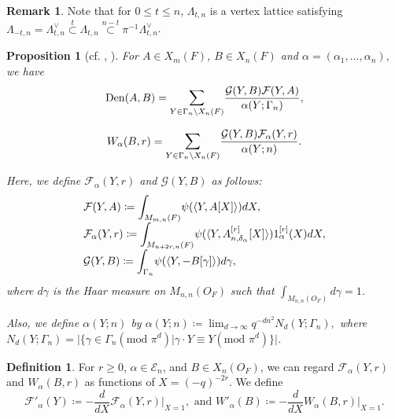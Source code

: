 \documentclass[11pt,oneside]{amsart}
\theoremstyle{plain}
\newtheorem{proposition}[theorem]{Proposition}
\theoremstyle{definition}
\newtheorem{definition}[theorem]{Definition}
\newtheorem{remark}[theorem]{Remark}
\theoremstyle{remark}
\newcommand{\CE}{{\mathcal E}}
\newcommand{\CF}{{\mathcal F}}
\newcommand{\CG}{{\mathcal G}}
\newcommand{\alphad}{\mathrm{Den}}
\numberwithin{equation}{section}
\begin{document}
	\begin{remark}
		Note that for $0 \leq t \leq n$, $\Lambda_{t,n}$ is a vertex lattice satisfying $\Lambda_{-t,n}=\Lambda_{t,n}^{\vee} \overset{t}{\subset} \Lambda_{t,n} \overset{n-t}{\subset} \pi^{-1}\Lambda_{t,n}^{\vee}$.
	\end{remark}
	
	
	\begin{proposition}[cf. {\cite{Hi}}, {\cite[Lemma 3.5]{Cho}}]\label{proposition2.3}  For $A \in X_{m}(F)$, $B \in X_{n}(F)$ and $\alpha=(\alpha_1,\dots, \alpha_n)$, we have
		\begin{equation*}
			\alphad(A,B)=\mathlarger{\sum}_{Y \in \Gamma_{n} \setminus X_{n}(F)}\dfrac{\CG(Y,B)\CF(Y,A)}{\alpha(Y;\Gamma_{n})},
		\end{equation*}
		
		\begin{equation*}
			W_{\alpha}(B,r)=\mathlarger{\sum}_{Y \in \Gamma_{n} \setminus X_{n}(F)}\dfrac{\CG(Y,B)\CF_{\alpha}(Y,r)}{\alpha(Y;n)}.
		\end{equation*}
		
		Here, we define $\CF_{\alpha}(Y,r)$ and $\CG(Y,B)$ as follows:
		\begin{equation*}\begin{array}{l}
				\CF(Y,A)\coloneqq \mathlarger{\int}_{M_{m,n}(F)}\psi(\langle Y,A[X] \rangle)dX,\\
				\CF_{\alpha}(Y,r)\coloneqq \mathlarger{\int}_{M_{n+2r,n}(F)}\psi(\langle Y,A_{n,\delta_{\alpha}}^{[r]}[X] \rangle)1_{\alpha}^{[r]}(X)dX,\\
				\CG(Y,B)\coloneqq \mathlarger{\int}_{\Gamma_{n}}\psi(\langle Y, -B[\gamma]\rangle)d\gamma,
			\end{array}
		\end{equation*}
		where $d\gamma$ is the Haar measure on $M_{n,n}(O_F)$ such that $\int_{M_{n,n}(O_F)}d\gamma=1$.
		
		Also, we define $\alpha(Y;n)$ by $\alpha(Y;n)\coloneqq \lim_{d\rightarrow \infty} q^{-dn^2}N_d(Y;\Gamma_{n}),$ where $N_d(Y;\Gamma_{n})=\vert \lbrace \gamma \in \Gamma_{n}( \text{mod } \pi^d) \vert \gamma \cdot Y \equiv Y ( \text{mod } \pi^{d})\rbrace \vert$.
		
		
	\end{proposition}
	
	\begin{definition} For $r \geq 0$, $\alpha \in \CE_n$, and $B \in X_n(O_F)$, we can regard $\CF_{\alpha}(Y,r)$ and $W_{\alpha}(B,r)$ as functions of $X=(-q)^{-2r}$. We define
		\begin{equation*}
			\CF'_{\alpha}(Y)\coloneqq -\dfrac{d}{dX}\CF_{\alpha}(Y,r)\vert_{X=1}, \text{ and }W'_{\alpha}(B)\coloneqq -\dfrac{d}{dX}W_{\alpha}(B,r)\vert_{X=1}.
		\end{equation*}
	\end{definition}
	
\end{document}
